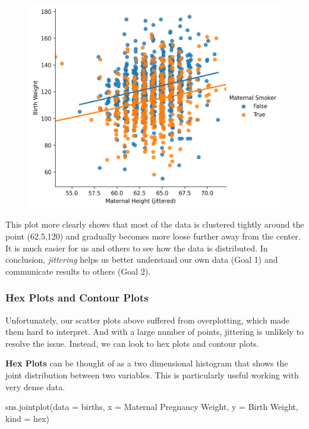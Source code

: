 \documentclass[
  letterpaper,
  DIV=11,
  numbers=noendperiod]{scrreprt}
\newenvironment{Shaded}{\begin{snugshade}}{\end{snugshade}}
\newcommand{\NormalTok}[1]{\textcolor[rgb]{0.00,0.23,0.31}{#1}}
\newcommand{\OperatorTok}[1]{\textcolor[rgb]{0.37,0.37,0.37}{#1}}
\newcommand{\StringTok}[1]{\textcolor[rgb]{0.13,0.47,0.30}{#1}}
\begin{document}
\begin{figure}[H]

{\centering \includegraphics{visualization_2/visualization_2_files/figure-pdf/cell-10-output-1.png}

}

\end{figure}

This plot more clearly shows that most of the data is clustered tightly
around the point (62.5,120) and gradually becomes more loose further
away from the center. It is much easier for us and others to see how the
data is distributed. In conclusion, \emph{jittering} helps us better
understand our own data (Goal 1) and communicate results to others (Goal
2).

\hypertarget{hex-plots-and-contour-plots}{%
\subsubsection{Hex Plots and Contour
Plots}\label{hex-plots-and-contour-plots}}

Unfortunately, our scatter plots above suffered from overplotting, which
made them hard to interpret. And with a large number of points,
jittering is unlikely to resolve the issue. Instead, we can look to hex
plots and contour plots.

\textbf{Hex Plots} can be thought of as a two dimensional histogram that
shows the joint distribution between two variables. This is particularly
useful working with very dense data.

\begin{Shaded}
\begin{Highlighting}[]
\NormalTok{sns.jointplot(data }\OperatorTok{=}\NormalTok{ births, x }\OperatorTok{=} \StringTok{\textquotesingle{}Maternal Pregnancy Weight\textquotesingle{}}\NormalTok{, }
\NormalTok{              y }\OperatorTok{=} \StringTok{\textquotesingle{}Birth Weight\textquotesingle{}}\NormalTok{, kind }\OperatorTok{=} \StringTok{\textquotesingle{}hex\textquotesingle{}}\NormalTok{)}
\end{Highlighting}
\end{Shaded}
\end{document}
